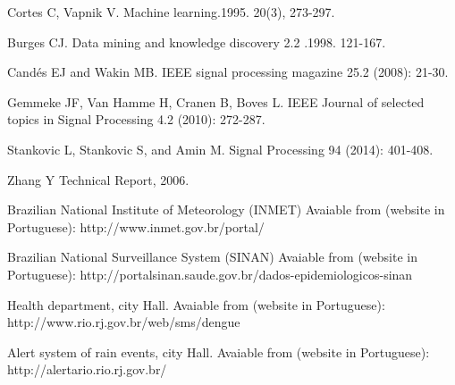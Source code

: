 \documentclass[final,leqno]{siamltexmm2}
\begin{document}
\begin{thebibliography}{10}
Cortes C,  Vapnik V.
\newblock   Machine learning.1995. 20(3), 273-297.



Burges CJ.
\newblock Data mining and knowledge discovery 2.2 .1998. 121-167.


Cand\'es EJ and Wakin MB. 
\newblock  IEEE signal processing magazine 25.2 (2008): 21-30.

Gemmeke JF, Van Hamme H, Cranen B, Boves L. 
\newblock IEEE Journal of selected topics in Signal Processing 4.2 (2010): 272-287.


Stankovic L, Stankovic S, and Amin M. 
\newblock Signal Processing 94 (2014): 401-408.

Zhang Y 
\newblock  Technical Report, 2006.


Brazilian National Institute of Meteorology (INMET)
\newblock  Avaiable from (website in Portuguese): http://www.inmet.gov.br/portal/ 






Brazilian National Surveillance System (SINAN)
\newblock  Avaiable from (website in Portuguese): http://portalsinan.saude.gov.br/dados-epidemiologicos-sinan 



Health department, city Hall.
\newblock  Avaiable from (website in Portuguese): http://www.rio.rj.gov.br/web/sms/dengue







Alert system of rain events, city Hall.
\newblock Avaiable from (website in Portuguese): http://alertario.rio.rj.gov.br/   



\end{thebibliography}
\end{document}

